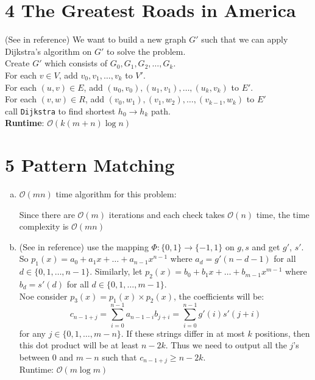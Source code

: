 \documentclass[11pt]{article}
\newenvironment{qparts}{\begin{enumerate}[(a)]}{\end{enumerate}}
\begin{document}
	\section*{4 The Greatest Roads in America}
	(See in reference) We want to build a new graph $G'$ such that we can apply Dijkstra’s algorithm on $G′$ to solve the problem.\\
	Create $G'$ which consists of $G_0, G_1, G_2, \dots, G_k$. \\
	For each $v \in V$, add $v_0, v_1, \dots ,v_k$ to $V'$.\\
	For each $(u, v) \in E$, add $(u_0, v_0), (u_1, v_1), \dots, (u_k, v_k)$ to $E'$.\\
	For each $(v, w) \in R$, add $(v_0, w_1), (v_1, w_2), \dots, (v_{k-1}, w_k)$ to $E'$\\
	call \texttt{Dijkstra} to find shortest $h_0 \rightarrow h_k$ path. \\
	\textbf{Runtime}: $\mathcal{O}(k(m + n) \log n)$
	
	\section*{5 Pattern Matching}
	\begin{qparts}
		\item $\mathcal{O}(mn)$ time algorithm for this problem: \\
		\begin{algorithm}[H]
		\end{algorithm}
		Since there are $\mathcal{O}(m)$ iterations and each check takes $\mathcal{O}(n)$ time, the time complexity is $\mathcal{O}(mn)$
		
		\item 
		(See in reference) use the mapping $\Phi:\{0,1\} \rightarrow \{-1, 1\}$ on $g, s$ and get $g'$, $s'$. So $p_1(x) = a_0 + a_1x + \dots + a_{n-1}x^{n-1}$ where $a_d = g'(n-d-1)$ for all $d\in\{0,1,\dots, n-1\}$. Similarly, let $p_2(x) = b_0 + b_1x + \dots + b_{m-1}x^{m-1}$ where $b_d = s'(d)$ for all $d \in \{0, 1, \dots, m-1\}$.\\
		Noe consider $p_3(x) = p_1(x) \times p_2(x)$, the coefficients will be:
		$$c_{n-1+j} = \sum_{i=0}^{n-1}a_{n-1-i}b_{j+i} = \sum_{i=0}^{n-1}g'(i)s'(j+i)$$
		for any $j \in \{0, 1, \dots , m-n\}$. If these strings differ in at most $k$ positions, then this dot product will be at least $n-2k$. Thus we need to output all the $j$'s between $0$ and $m-n$ such that $c_{n-1+j}\geq n-2k$.\\
		Runtime: $\mathcal{O}(m\log m)$
	\end{qparts}
\end{document}
